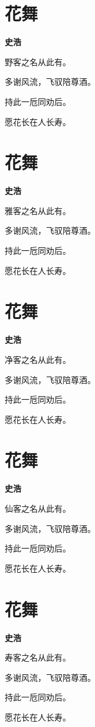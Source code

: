 \documentclass[12pt,a4paper]{ctexbook}
\begin{document}
\section{花舞}
\textbf{史浩}\par\vspace{0.5em}
野客之名从此有。\par
多谢风流，飞驭陪尊酒。\par
持此一卮同劝后。\par
愿花长在人长寿。\par

\section{花舞}
\textbf{史浩}\par\vspace{0.5em}
雅客之名从此有。\par
多谢风流，飞驭陪尊酒。\par
持此一卮同劝后。\par
愿花长在人长寿。\par

\section{花舞}
\textbf{史浩}\par\vspace{0.5em}
净客之名从此有。\par
多谢风流，飞驭陪尊酒。\par
持此一卮同劝后。\par
愿花长在人长寿。\par

\section{花舞}
\textbf{史浩}\par\vspace{0.5em}
仙客之名从此有。\par
多谢风流，飞驭陪尊酒。\par
持此一卮同劝后。\par
愿花长在人长寿。\par

\section{花舞}
\textbf{史浩}\par\vspace{0.5em}
寿客之名从此有。\par
多谢风流，飞驭陪尊酒。\par
持此一卮同劝后。\par
愿花长在人长寿。\par
\end{document}
